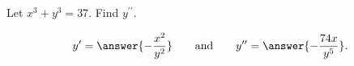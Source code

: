 \documentclass{ximera}
\begin{document}
\begin{example}
\label{example:6-9}
Let $x^{3}+y^{3}=37$. Find $y^{\prime \prime}$.

\[
y^{\prime}=\answer{-\frac{x^{2}}{y^{2}}}
\qquad\text{and}\qquad
y^{\prime\prime}=\answer{-\frac{74x}{y^{5}}}.
\]
\end{example}
\end{document}
